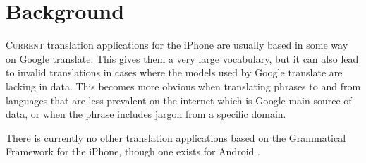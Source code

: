 \chapter{Background}
\lettrine[lines=4, loversize=-0.1, lraise=0.1]{C}{urrent} translation applications for the iPhone are usually based in some way on Google translate. This gives them a very large vocabulary, but it can also lead to invalid translations in cases where the models used by Google translate are lacking in data. This becomes more obvious when translating phrases to and from languages that are less prevalent on the internet which is Google main source of data, or when the phrase includes jargon from a specific domain.

There is currently no other translation applications based on the Grammatical Framework for the iPhone, though one exists for Android \cite{jpgf}.